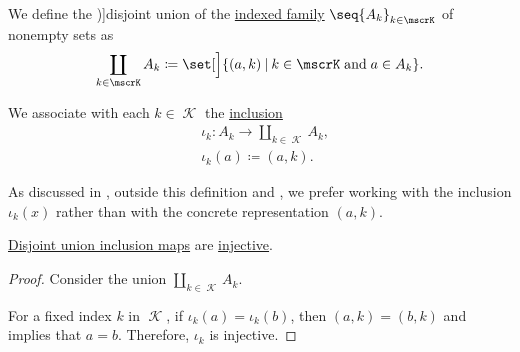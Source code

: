 \begin{definition}\label{def:disjoint_union}
  We define the \term[ru=дизъюнктное произведение, en=disjoint union (\cite[8]{Aluffi2009Algebra})]{disjoint union} of the \hyperref[def:indexed_family]{indexed family} \( \seq{ A_k }_{k \in \mscrK} \) of nonempty sets as
  \begin{equation}\label{eq:def:disjoint_union}
    \coprod_{k \in \mscrK} A_k \coloneqq \set[\Big]{ (a, k) \given k \in \mscrK \T{and} a \in A_k }.
  \end{equation}

  We associate with each \( k \in \mscrK \) the \hyperref[con:inclusion_and_projection]{inclusion}
  \begin{equation*}
    \begin{aligned}
      &\iota_k: A_k \to \coprod_{k \in \mscrK} A_k, \\
      &\iota_k(a) \coloneqq (a, k).
    \end{aligned}
  \end{equation*}
\end{definition}
\begin{comments}
  \item As discussed in , outside this definition and , we prefer working with the inclusion \( \iota_k(x) \) rather than with the concrete representation \( (a, k) \).
\end{comments}

\begin{proposition}\label{thm:disjoint_product_inclusions_injective}
  \hyperref[def:disjoint_union]{Disjoint union inclusion maps} are \hyperref[def:function_invertibility/injective]{injective}.
\end{proposition}
\begin{proof}
  Consider the union \( \coprod_{k \in \mscrK} A_k \).

  For a fixed index \( k \) in \( \mscrK \), if \( \iota_k(a) = \iota_k(b) \), then \( (a, k) = (b, k) \) and  implies that \( a = b \). Therefore, \( \iota_k \) is injective.
\end{proof}

